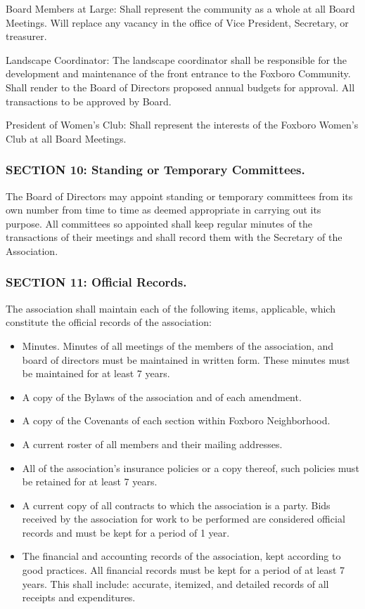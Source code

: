 Board Members at Large: Shall represent the community as a whole at all
Board Meetings. Will replace any vacancy in the office of Vice President,
Secretary, or treasurer.

Landscape Coordinator: The landscape coordinator shall be responsible
for the development and maintenance of the front entrance to the Foxboro
Community. Shall render to the Board of Directors proposed annual budgets
for approval. All transactions to be approved by Board.

President of Women’s Club: Shall represent the interests of the Foxboro
Women’s Club at all Board Meetings.

\subsubsection{SECTION 10: Standing or Temporary Committees.}
The Board of Directors may appoint standing or temporary committees from
its own number from time to time as deemed appropriate in carrying out
its purpose. All committees so appointed shall keep regular minutes
of the transactions of their meetings and shall record them with the
Secretary of the Association.

\subsubsection{SECTION 11: Official Records.}
The association shall maintain each of the following items, applicable,
which constitute the official records of the association:

\begin{itemize}

\item Minutes. Minutes of all meetings of the members of the association,
and board of directors must be maintained in written form. These minutes
must be maintained for at least 7 years.

\item A copy of the Bylaws of the association and of each amendment.

\item A copy of the Covenants of each section within Foxboro Neighborhood.

\item A current roster of all members and their mailing addresses.

\item All of the association’s insurance policies or a copy thereof,
such policies must be retained for at least 7 years.

\item A current copy of all contracts to which the association is a
party. Bids received by the association for work to be performed are
considered official records and must be kept for a period of 1 year.

\item The financial and accounting records of the association, kept
according to good practices. All financial records must be kept for
a period of at least 7 years. This shall include: accurate, itemized,
and detailed records of all receipts and expenditures.

\end{itemize}

